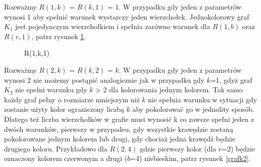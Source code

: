
 Rozważmy $R(1,k)$ = $R(k,1)$ = 1.  W przypadku gdy jeden z parametrów wynosi 1 aby spełnić warunek wystarczy jeden wierzchołek.  Jednokolorowy graf $\mathit{K}_{1}$ jest pojedynczym wierzchołkiem i spełnia zarówno warunek dla $R(1,b)$ oraz $R(r,1)$, patrz rysunek \ref{grafk1}. 
  
  \begin{figure}[h]
  \centering
   \caption{R(1,k,1)}
   \label{grafk1}
\end{figure}
  
  \hfill \par
	Rozważmy $R(2,k)$ = $R(k,2)$ = $k$. W przypadku gdy jeden z parametrów wynosi 2 nie możemy postąpić analogicznie jak w przypadku gdy $k$=1, gdyż graf $\mathit{K}_{2}$ nie spełni warunku gdy $k$ > 2 dla kolorowania jednym kolorem. Tak samo każdy graf pełny o rozmiarze mniejszym niż $k$ nie spełnia warunku w sytuacji gdy zostanie użyty kolor ograniczony liczbą $k$ aby pokolorować go w jednolity sposób. Dlatego też liczba wierzchołków w grafie musi wynosić k co zawsze spełni jeden z dwóch warunków, pierwszy w przypadeu, gdy wszystkie krawędzie zostaną pokolorowane jednym kolorem lub drugi, gdy chociaż jedna krawędź będzie drugiego koloru. Przykładowo dla $R(2,4)$ gdzie pierwszy kolor (dla $r$=2) będzie oznaczony kolorem czerwonym a drugi ($b$=4) niebieskim, patrz rysunek \ref{grafk2}.
	
